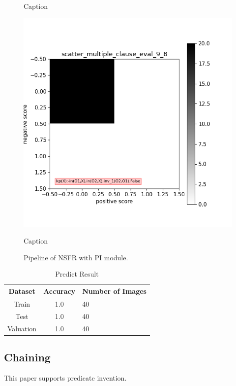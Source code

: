 \begin{figure}[H]
\begin{minipage}[b]{.3\textwidth}
        \caption{Caption}\label{label-h}
    \end{minipage}
    \begin{minipage}[b]{.3\textwidth}
        \includegraphics[width=\textwidth]{img/mce/mce-8}
        \caption{Caption}\label{label-i}
    \end{minipage}
    \caption{Pipeline of NSFR with PI module.}
    \label{fig:mce}
\end{figure}



\begin{table}
    \caption{Predict Result}
    \label{tab:nearby-pi-result}
    \begin{tabular}{ccl}
        \toprule
        Dataset   & Accuracy & Number of Images \\
        \midrule
        Train     & 1.0      & 40               \\
        Test      & 1.0      & 40               \\
        Valuation & 1.0      & 40               \\
        \bottomrule
    \end{tabular}
\end{table}

\subsection{Chaining}
This paper\cite{dILP} supports predicate invention.


